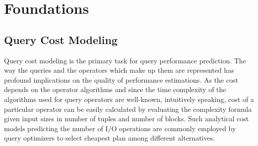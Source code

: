 
\chapter{Foundations} %

\label{Chapter2} %


\section{Query Cost Modeling}

Query cost modeling is the primary task for query performance prediction. The way the queries and the operators which make up them are represented has profound implications on the quality of performance estimations. As the cost depends on the operator algorithms and since the time complexity of the algorithms used for query operators are well-known, intuitively speaking, cost of a particular operator can be easily calculated by evaluating the complexity formula given input sizes in number of tuples and number of blocks. Such analytical cost models predicting the number of I/O operations are commonly employed by query optimizers to select cheapest plan among different alternatives. 

